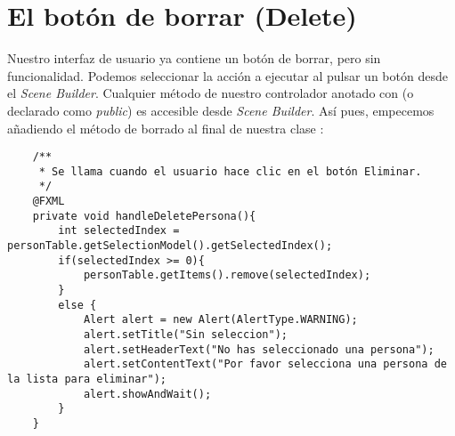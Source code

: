 \section{El botón de borrar (Delete)}
Nuestro interfaz de usuario ya contiene un botón de borrar, pero sin funcionalidad. Podemos seleccionar la 
acción a ejecutar al pulsar un botón desde el \textit{Scene Builder}. Cualquier método de nuestro controlador 
anotado con  (o declarado como \textit{public}) es accesible desde \textit{Scene Builder}. 
Así pues, empecemos añadiendo el método de borrado al final de nuestra clase :\\

\begin{verbatim}
    /**
	 * Se llama cuando el usuario hace clic en el botón Eliminar.
	 */
	@FXML
	private void handleDeletePersona(){
		int selectedIndex = personTable.getSelectionModel().getSelectedIndex();
		if(selectedIndex >= 0){
			personTable.getItems().remove(selectedIndex);
		}
		else {
			Alert alert = new Alert(AlertType.WARNING);
			alert.setTitle("Sin seleccion");
			alert.setHeaderText("No has seleccionado una persona");
			alert.setContentText("Por favor selecciona una persona de la lista para eliminar");
			alert.showAndWait();
		}
	}
\end{verbatim}


